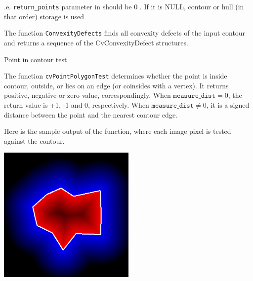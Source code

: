 \begin{description}
.e. \texttt{return\_points} parameter in  should be 0
. If it is NULL, contour or hull (in that order) storage is used
\end{description}

The function \texttt{ConvexityDefects} finds all convexity defects of the input contour and returns a sequence of the CvConvexityDefect structures.

\label{PointPolygonTest}

Point in contour test


\begin{description}
\end{description}

The function \texttt{cvPointPolygonTest} determines whether the
point is inside contour, outside, or lies on an edge (or coinsides
with a vertex). It returns positive, negative or zero value,
correspondingly. When $\texttt{measure\_dist}=0$, the return value
is +1, -1 and 0, respectively. When $\texttt{measure\_dist} \ne 0$,
it is a signed distance between the point and the nearest contour
edge.

Here is the sample output of the function, where each image pixel is tested against the contour.

\includegraphics[width=0.5\textwidth]{pics/pointpolygon.png}

